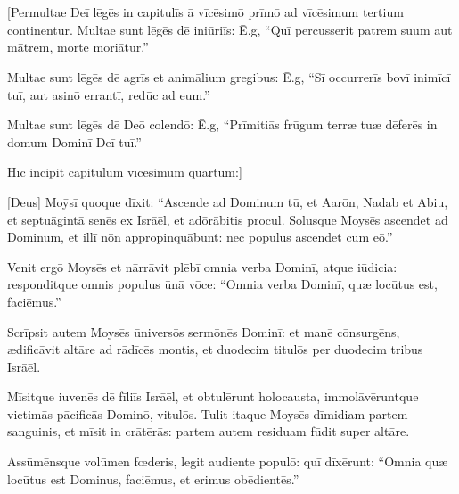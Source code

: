 \chapter{}


\vspace*{-1.4cm}
\thispagestyle{empty}

[Permultae Deī lēgēs in capitulīs ā vīcēsimō prīmō ad vīcēsimum tertium
continentur. Multae sunt lēgēs dē iniūriīs: Ē.g, ``Quī percusserit patrem
suum aut mātrem, morte moriātur.''

Multae sunt lēgēs dē agrīs et animālium
gregibus: Ē.g, ``Sī occurrerīs bovī inimīcī tuī, aut asinō errantī, redūc
ad eum.''

Multae sunt lēgēs dē Deō colendō: Ē.g, ``Prīmitiās frūgum terræ
tuæ dēferēs in domum Dominī Deī tuī.''

Hīc incipit
capitulum vīcēsimum quārtum:]

[Deus] Moȳsī quoque dīxit: ``Ascende ad Dominum
tū, et Aarōn, Nadab et Abiu, et septuāgintā senēs ex
Isrāēl, et adōrābitis procul.
Solusque
Moysēs ascendet ad Dominum, et illī nōn appropinquābunt:
nec populus ascendet cum eō.''

Venit ergō Moysēs et nārrāvit
plēbī omnia verba Dominī, atque
iūdicia:
responditque omnis populus ūnā vōce: ``Omnia verba Dominī, quæ locūtus est,
faciēmus.''

Scrīpsit autem Moysēs ūniversōs sermōnēs Dominī: et manē
cōnsurgēns, ædificāvit altāre ad
rādīcēs montis,
et duodecim titulōs per duodecim tribus
Isrāēl. 

Mīsitque iuvenēs dē fīliīs Isrāēl, et obtulērunt
holocausta,
immolāvēruntque victimās pācificās Dominō, vitulōs.  
Tulit itaque Moysēs
dīmidiam partem sanguinis, et mīsit in crātērās: partem
autem residuam fūdit super altāre. 

Assūmēnsque volūmen fœderis, legit audiente populō: quī
dīxērunt: ``Omnia quæ locūtus est Dominus, faciēmus, et erimus
obēdientēs.''

